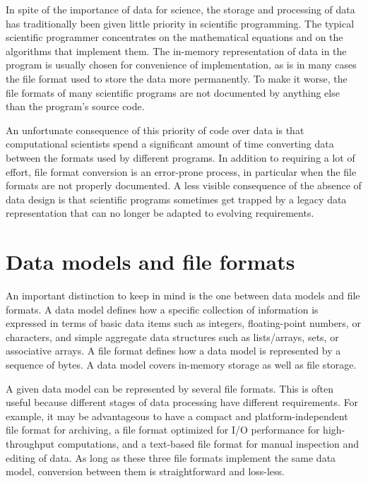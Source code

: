 \documentclass{csmagazine}
\begin{document}
In spite of the importance of data for science, the storage and processing of data has traditionally been given little priority in scientific programming. The typical scientific programmer concentrates on the mathematical equations and on the algorithms that implement them. The in-memory representation of data in the program is usually chosen for convenience of implementation, as is in many cases the file format used to store the data more permanently. To make it worse, the file formats of many scientific programs are not documented by anything else than the program's source code.

An unfortunate consequence of this priority of code over data is that computational scientists spend a significant amount of time converting data between the formats used by different programs. In addition to requiring a lot of effort, file format conversion is an error-prone process, in particular when the file formats are not properly documented. A less visible consequence of the absence of data design is that scientific programs sometimes get trapped by a legacy data representation that can no longer be adapted to evolving requirements.


\section*{Data models and file formats}

An important distinction to keep in mind is the one between data models and file formats. A data model defines how a specific collection of information is expressed in terms of basic data items such as integers, floating-point numbers, or characters, and simple aggregate data structures such as lists/arrays, sets, or associative arrays. A file format defines how a data model is represented by a sequence of bytes. A data model covers in-memory storage as well as file storage.

A given data model can be represented by several file formats. This is often useful because different stages of data processing have different requirements. For example, it may be advantageous to have a compact and platform-independent file format for archiving, a file format optimized for I/O performance for high-throughput computations, and a text-based file format for manual inspection and editing of data. As long as these three file formats implement the same data model, conversion between them is straightforward and loss-less.
\end{document}
